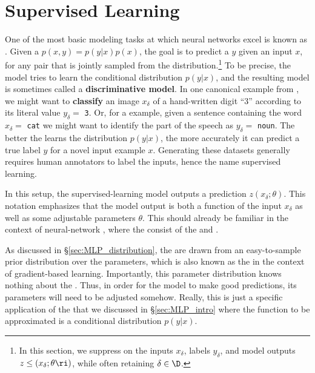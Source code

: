 \section{Supervised Learning}\label{sec:supervised-learning}
One of the most basic modeling tasks at which neural networks excel is known as .
Given a  $p(x,y)=p(y|x)p(x)$, the goal is to predict a  $y$ given an input $x$, for any pair that is jointly sampled from the distribution.\footnote{In this section, we suppress   on the inputs $x_\delta$, labels $y_\delta$, and model outputs $z\le(x_\delta;\theta\ri)$, while often retaining  $\delta\in\D$.} To be precise, the model tries to learn the conditional distribution $p(y|x)$, and the resulting model is sometimes called a \textbf{discriminative model}.
In one canonical example from , we might want to \textbf{classify} an image $x_{\delta}$ of a hand-written digit ``$3$'' according to its literal value $y_{\delta}=$ \texttt{3}. Or, for a  example, given a sentence containing the word $x_{\delta} =$ \texttt{cat} we might want to identify the part of the speech as $y_{\delta} =$ \texttt{noun}.  The better the  learns the distribution $p(y|x)$,  the more accurately it can predict a true label $y$ for a novel input example $x$. Generating these datasets generally requires human annotators to label the inputs, hence the name supervised learning.



In this setup, the supervised-learning model outputs a prediction $z(x_\delta; \theta)$.  This notation emphasizes that the model output is both a function of the input $x_\delta$ as well as some adjustable parameters $\theta$. This should already be familiar in the context of neural-network , where the  consist of
the  and .

As discussed in \S\ref{sec:MLP_distribution}, the  are drawn from an easy-to-sample prior distribution over the parameters, which is also known as the  in the context of gradient-based learning. Importantly, this parameter distribution knows nothing about the . Thus, in order for the model to make good predictions, its parameters will need to be adjusted somehow. Really, this is just a specific application of the  that we discussed in \S\ref{sec:MLP_intro} where the function to be approximated is a conditional distribution $p(y|x)$.

